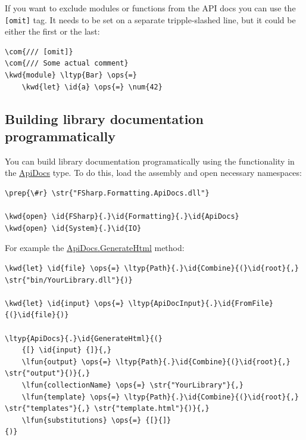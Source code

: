 \documentclass{article}
\newcommand{\id}[1]{\textcolor{black}{#1}}
\newcommand{\com}[1]{\textcolor{officegreen}{#1}}
\newcommand{\kwd}[1]{\textcolor{navy}{#1}}
\newcommand{\num}[1]{\textcolor{officegreen}{#1}}
\newcommand{\ops}[1]{\textcolor{purple}{#1}}
\newcommand{\prep}[1]{\textcolor{purple}{#1}}
\newcommand{\str}[1]{\textcolor{olive}{#1}}
\begin{document}
If you want to exclude modules or functions from the API docs you can use the \texttt{[omit]} tag.
It needs to be set on a separate tripple-slashed line, but it could be either the first or the last:
\begin{Verbatim}[commandchars=\\\{\}]
\com{/// [omit]}
\com{/// Some actual comment}
\kwd{module} \ltyp{Bar} \ops{=}
    \kwd{let} \id{a} \ops{=} \num{42}
\end{Verbatim}

\subsection*{Building library documentation programmatically}



You can build library documentation programatically using the functionality
in the \href{https://fsprojects.github.io/FSharp.Formatting/reference/fsharp-formatting-apidocs-apidocs.html}{ApiDocs} type. To do this, load the assembly and open necessary namespaces:
\begin{Verbatim}[commandchars=\\\{\}]
\prep{\#r} \str{"FSharp.Formatting.ApiDocs.dll"}

\kwd{open} \id{FSharp}{.}\id{Formatting}{.}\id{ApiDocs}
\kwd{open} \id{System}{.}\id{IO}
\end{Verbatim}



For example the \href{https://fsprojects.github.io/FSharp.Formatting/reference/fsharp-formatting-apidocs-apidocs.html}{ApiDocs.GenerateHtml} method:
\begin{Verbatim}[commandchars=\\\{\}]
\kwd{let} \id{file} \ops{=} \ltyp{Path}{.}\id{Combine}{(}\id{root}{,} \str{"bin/YourLibrary.dll"}{)}

\kwd{let} \id{input} \ops{=} \ltyp{ApiDocInput}{.}\id{FromFile}{(}\id{file}{)}

\ltyp{ApiDocs}{.}\id{GenerateHtml}{(}
    {[} \id{input} {]}{,}
    \lfun{output} \ops{=} \ltyp{Path}{.}\id{Combine}{(}\id{root}{,} \str{"output"}{)}{,}
    \lfun{collectionName} \ops{=} \str{"YourLibrary"}{,}
    \lfun{template} \ops{=} \ltyp{Path}{.}\id{Combine}{(}\id{root}{,} \str{"templates"}{,} \str{"template.html"}{)}{,}
    \lfun{substitutions} \ops{=} {[}{]}
{)}
\end{Verbatim}
\end{document}
